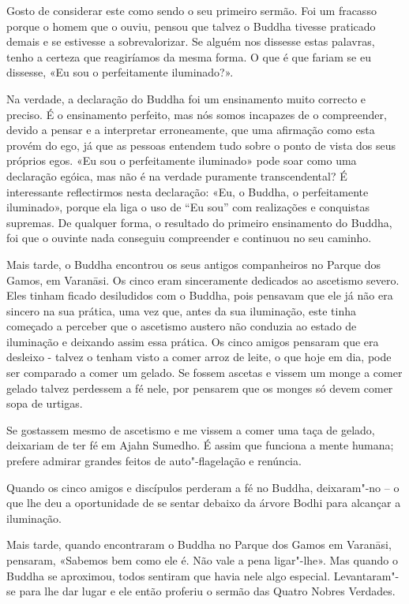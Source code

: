 \enlargethispage{\baselineskip}

Gosto de considerar este como sendo o seu primeiro sermão. Foi um fracasso
porque o homem que o ouviu, pensou que talvez o Buddha tivesse praticado demais e se
estivesse a sobrevalorizar. Se alguém nos dissesse estas palavras, tenho a
certeza que reagiríamos da mesma forma. O que é que fariam se eu dissesse, «Eu
sou o perfeitamente iluminado?».

Na verdade, a declaração do Buddha foi um ensinamento muito correcto e preciso.
É o ensinamento perfeito, mas nós somos incapazes de o compreender, devido a
pensar e a interpretar erroneamente, que uma afirmação como esta provém do ego,
já que as pessoas entendem tudo sobre o ponto de vista dos seus próprios egos.
«Eu sou o perfeitamente iluminado» pode soar como uma declaração egóica, mas não
é na verdade puramente transcendental? É interessante reflectirmos nesta declaração: 
«Eu, o Buddha, o perfeitamente iluminado», porque ela liga o uso de
“Eu sou” com realizações e conquistas supremas. De qualquer forma, o resultado
do primeiro ensinamento do Buddha, foi que o ouvinte nada conseguiu compreender
e continuou no seu caminho.

\enlargethispage{\baselineskip}

Mais tarde, o Buddha encontrou os seus antigos companheiros no Parque dos
Gamos, em Varanāsi. Os cinco eram sinceramente dedicados ao ascetismo severo.
Eles tinham ficado desiludidos com o Buddha, pois pensavam que ele já não era
sincero na sua prática, uma vez que, antes da sua iluminação, este tinha começado a
perceber que o ascetismo austero não conduzia ao estado de iluminação e deixando assim essa prática. 
Os cinco amigos pensaram que era desleixo - talvez o tenham
visto a comer arroz de leite, o que hoje em dia, pode ser comparado a comer um
gelado. Se fossem ascetas e vissem um monge a comer gelado talvez perdessem a fé
nele, por pensarem que os monges só devem comer sopa de urtigas.

Se gostassem mesmo de ascetismo e me vissem a comer uma taça de gelado,
deixariam de ter fé em Ajahn Sumedho. É assim que funciona a mente humana;
prefere admirar grandes feitos de auto"-flagelação e renúncia.

Quando os cinco amigos e discípulos perderam a fé no Buddha, deixaram"-no – o que
lhe deu a oportunidade de se sentar debaixo da árvore Bodhi para alcançar a
iluminação.

Mais tarde, quando encontraram o Buddha no Parque dos Gamos em Varanāsi,
pensaram, «Sabemos bem como ele é. Não vale a pena ligar"-lhe». Mas quando o
Buddha se aproximou, todos sentiram que havia nele algo especial. Levantaram"-se
para lhe dar lugar e ele então proferiu o sermão das Quatro Nobres Verdades.

